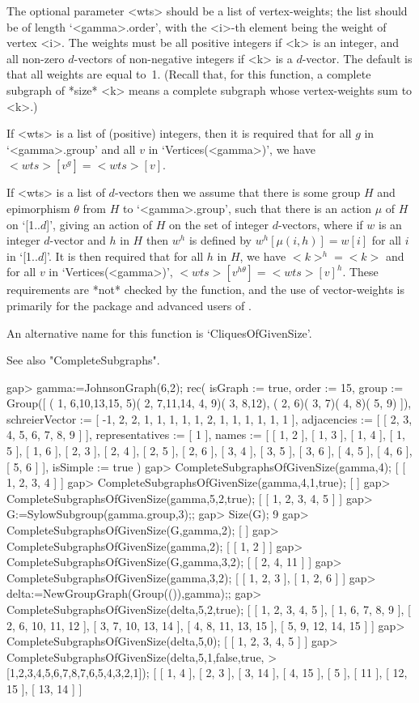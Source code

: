 The optional parameter <wts> should be a list of vertex-weights; the list
should be of length `<gamma>.order', with the <i>-th element being the
weight of vertex <i>. The weights must be all positive integers if <k>
is an integer, and all non-zero $d$-vectors of non-negative integers
if <k> is a $d$-vector. The default is that all weights are equal to~1.
(Recall that, for this function, a complete subgraph of *size* <k> 
means a complete subgraph whose vertex-weights sum to <k>.)

If <wts> is a list of (positive) integers, then it is required that
for all $g$ in `<gamma>.group' and all $v$ in `Vertices(<gamma>)',
we have $<wts>[v^g]=<wts>[v]$.

If <wts> is a list of $d$-vectors then we assume that there is some group
$H$ and epimorphism $\theta$ from $H$ to `<gamma>.group', such that there
is an action $\mu$ of $H$ on `[1..$d$]', giving an action of $H$ on the
set of integer $d$-vectors, where if $w$ is an integer $d$-vector and
$h$ in $H$ then $w^h$ is defined by $w^h[\mu(i,h)]=w[i]$ for all $i$
in `[1..$d$]'. It is then required that for all $h$ in $H$, we have
$<k>^h=<k>$ and for all $v$ in `Vertices(<gamma>)', $<wts>[v^{h\theta}]
= <wts>[v]^h$.  These requirements are *not* checked by the function,
and the use of vector-weights is primarily for the {\DESIGN} package
and advanced users of {\GRAPE}.

An alternative name for this function is 
`CliquesOfGivenSize'.

See also "CompleteSubgraphs".

\beginexample
gap> gamma:=JohnsonGraph(6,2);                       
rec( isGraph := true, order := 15, 
  group := Group([ ( 1, 6,10,13,15, 5)( 2, 7,11,14, 4, 9)( 3, 8,12), 
      ( 2, 6)( 3, 7)( 4, 8)( 5, 9) ]), 
  schreierVector := [ -1, 2, 2, 1, 1, 1, 1, 1, 2, 1, 1, 1, 1, 1, 1 ], 
  adjacencies := [ [ 2, 3, 4, 5, 6, 7, 8, 9 ] ], representatives := [ 1 ], 
  names := [ [ 1, 2 ], [ 1, 3 ], [ 1, 4 ], [ 1, 5 ], [ 1, 6 ], [ 2, 3 ], 
      [ 2, 4 ], [ 2, 5 ], [ 2, 6 ], [ 3, 4 ], [ 3, 5 ], [ 3, 6 ], [ 4, 5 ], 
      [ 4, 6 ], [ 5, 6 ] ], isSimple := true )
gap> CompleteSubgraphsOfGivenSize(gamma,4);
[ [ 1, 2, 3, 4 ] ]
gap> CompleteSubgraphsOfGivenSize(gamma,4,1,true);
[  ]
gap> CompleteSubgraphsOfGivenSize(gamma,5,2,true);
[ [ 1, 2, 3, 4, 5 ] ]
gap> G:=SylowSubgroup(gamma.group,3);;
gap> Size(G);
9
gap> CompleteSubgraphsOfGivenSize(G,gamma,2);
[  ]
gap> CompleteSubgraphsOfGivenSize(gamma,2);
[ [ 1, 2 ] ]
gap> CompleteSubgraphsOfGivenSize(G,gamma,3,2);
[ [ 2, 4, 11 ] ]
gap> CompleteSubgraphsOfGivenSize(gamma,3,2);
[ [ 1, 2, 3 ], [ 1, 2, 6 ] ]
gap> delta:=NewGroupGraph(Group(()),gamma);;
gap> CompleteSubgraphsOfGivenSize(delta,5,2,true);
[ [ 1, 2, 3, 4, 5 ], [ 1, 6, 7, 8, 9 ], [ 2, 6, 10, 11, 12 ], 
  [ 3, 7, 10, 13, 14 ], [ 4, 8, 11, 13, 15 ], [ 5, 9, 12, 14, 15 ] ]
gap> CompleteSubgraphsOfGivenSize(delta,5,0);
[ [ 1, 2, 3, 4, 5 ] ]
gap> CompleteSubgraphsOfGivenSize(delta,5,1,false,true,
>       [1,2,3,4,5,6,7,8,7,6,5,4,3,2,1]);
[ [ 1, 4 ], [ 2, 3 ], [ 3, 14 ], [ 4, 15 ], [ 5 ], [ 11 ], [ 12, 15 ], 
  [ 13, 14 ] ]
\endexample


